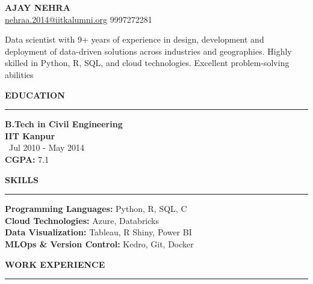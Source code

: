 \documentclass[a4paper,10pt]{article}
\begin{document}
\begin{center}
    \textbf{\LARGE \MakeUppercase{Ajay Nehra}} \\
    \vspace{1mm}
    \href{mailto:nehraa.2014@iitkalumni.org}{nehraa.2014@iitkalumni.org} \hspace{5mm} 9997272281
\end{center}

\vspace{2mm} %

Data scientist with 9+ years of experience in design, development and deployment of data-driven solutions across industries and geographies. Highly skilled in Python, R, SQL, and cloud technologies. Excellent problem-solving abilities

\vspace{2mm}

\begin{multicols}{2}

\textbf{\LARGE \MakeUppercase{Education}} \\
\vspace{1mm}
\rule{\columnwidth}{0.8pt} %
\textbf{B.Tech in Civil Engineering} \\
\textbf{IIT Kanpur} \\
\faCalendar \, Jul 2010 - May 2014 \\
\textbf{CGPA:} 7.1

\columnbreak

\textbf{\LARGE \MakeUppercase{Skills}} \\
\vspace{1mm}
\rule{\columnwidth}{0.8pt} %
\textbf{Programming Languages:} Python, R, SQL, C \\
\textbf{Cloud Technologies:} Azure, Databricks \\
\textbf{Data Visualization:} Tableau, R Shiny, Power BI \\
\textbf{MLOps \& Version Control:} Kedro, Git, Docker

\end{multicols}

\vspace{2mm} %

\textbf{\LARGE \MakeUppercase{Work Experience}} \\
\vspace{1mm}
\rule{\textwidth}{0.8pt} %
\end{document}
